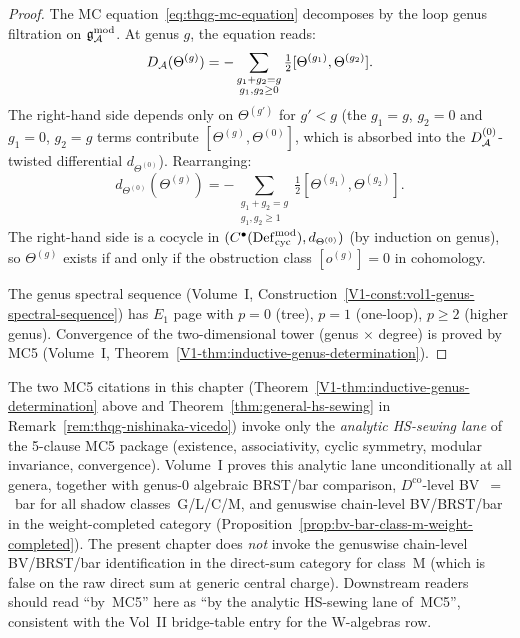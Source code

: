 \begin{proof}
The MC equation~\eqref{eq:thqg-mc-equation} decomposes by the loop
genus filtration on $\mathfrak{g}_{\mathcal{A}}^{\mathrm{mod}}$. At genus $g$, the equation reads:
\[
D_{\mathcal{A}}(\Theta^{(g)})
= -\sum_{\substack{g_1+g_2=g \\ g_1,g_2 \ge 0}}
\tfrac{1}{2}[\Theta^{(g_1)}, \Theta^{(g_2)}].
\]
The right-hand side depends only on $\Theta^{(g')}$ for $g' < g$ (the
$g_1=g$, $g_2=0$ and $g_1=0$, $g_2=g$ terms contribute
$[\Theta^{(g)}, \Theta^{(0)}]$, which is absorbed into the
$D_{\mathcal{A}}^{(0)}$-twisted differential $d_{\Theta^{(0)}}$).
Rearranging:
\[
d_{\Theta^{(0)}}(\Theta^{(g)})
= -\sum_{\substack{g_1+g_2=g \\ g_1,g_2 \ge 1}}
\tfrac{1}{2}[\Theta^{(g_1)}, \Theta^{(g_2)}].
\]
The right-hand side is a cocycle in $(C^\bullet(\mathrm{Def}_{\mathrm{cyc}}^{\mathrm{mod}}),
d_{\Theta^{(0)}})$ (by induction on genus), so $\Theta^{(g)}$ exists
if and only if the obstruction class $[o^{(g)}] = 0$ in cohomology.

The genus spectral sequence
(Volume~I, Construction~\ref{V1-const:vol1-genus-spectral-sequence}) has
$E_1$ page with $p=0$ (tree), $p=1$ (one-loop), $p \ge 2$ (higher genus).
Convergence of the two-dimensional tower (genus $\times$ degree) is proved
by MC5 (Volume~I, Theorem~\ref{V1-thm:inductive-genus-determination}).
\end{proof}

\begin{remark}
\label{rem:mc5-citation-scope-guard}
The two MC5 citations in this chapter
(Theorem~\ref*{V1-thm:inductive-genus-determination} above and
Theorem~\ref{thm:general-hs-sewing} in
Remark~\ref*{rem:thqg-nishinaka-vicedo}) invoke only the
\emph{analytic HS-sewing lane} of the 5-clause MC5 package
(existence, associativity, cyclic symmetry, modular invariance,
convergence). Volume~I proves this analytic lane unconditionally at
all genera, together with genus-$0$ algebraic BRST/bar comparison,
$D^{\mathrm{co}}$-level BV~$=$~bar for all shadow classes~G/L/C/M,
and genuswise chain-level BV/BRST/bar in the weight-completed
category (Proposition~\ref{prop:bv-bar-class-m-weight-completed}). The
present chapter does \emph{not} invoke the genuswise chain-level
BV/BRST/bar identification in the direct-sum category for class~M
(which is false on the raw direct sum at generic central charge).
Downstream readers should read
``by~MC5'' here as ``by the analytic HS-sewing lane of~MC5'',
consistent with the Vol~II bridge-table entry for the W-algebras row.
\end{remark}


